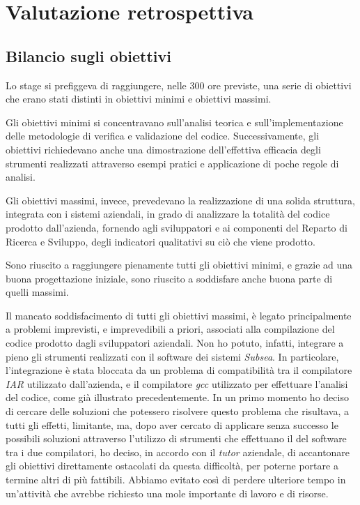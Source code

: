 \chapter{Valutazione retrospettiva}

\section{Bilancio sugli obiettivi}
Lo stage si prefiggeva di raggiungere, nelle 300 ore previste, una serie di obiettivi che erano stati distinti in obiettivi minimi e obiettivi massimi.

Gli obiettivi minimi si concentravano sull'analisi teorica e sull'implementazione delle metodologie di verifica e validazione del codice. Successivamente, gli obiettivi richiedevano anche una dimostrazione dell'effettiva efficacia degli strumenti realizzati attraverso esempi pratici e applicazione di poche regole di analisi.

Gli obiettivi massimi, invece, prevedevano la realizzazione di una solida struttura, integrata con i sistemi aziendali, in grado di analizzare la totalità del codice prodotto dall'azienda, fornendo agli sviluppatori e ai componenti del Reparto di Ricerca e Sviluppo, degli indicatori qualitativi su ciò che viene prodotto.

Sono riuscito a raggiungere pienamente tutti gli obiettivi minimi, e grazie ad una buona progettazione iniziale, sono riuscito a soddisfare anche buona parte di quelli massimi.

Il mancato soddisfacimento di tutti gli obiettivi massimi, è legato principalmente a problemi imprevisti, e imprevedibili a priori, associati alla compilazione del codice prodotto dagli sviluppatori aziendali. Non ho potuto, infatti, integrare a pieno gli strumenti realizzati con il software dei sistemi \textit{Subsea}. In particolare, l'integrazione è stata bloccata da un problema di compatibilità tra il compilatore \textit{IAR} utilizzato dall'azienda, e il compilatore \textit{gcc} utilizzato per effettuare l'analisi del codice, come già illustrato precedentemente. In un primo momento ho deciso di cercare delle soluzioni che potessero risolvere questo problema che risultava, a tutti gli effetti, limitante, ma, dopo aver cercato di applicare senza successo le possibili soluzioni attraverso l'utilizzo di strumenti che effettuano il  del software tra i due compilatori, ho deciso, in accordo con il \textit{tutor} aziendale, di accantonare gli obiettivi direttamente ostacolati da questa difficoltà, per poterne portare a termine altri di più fattibili. Abbiamo evitato così di perdere ulteriore tempo in un'attività che avrebbe richiesto una mole importante di lavoro e di risorse.

